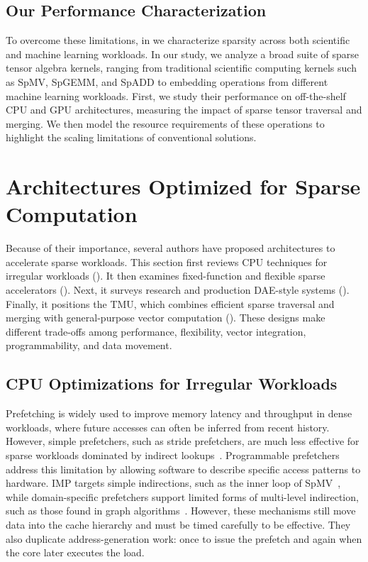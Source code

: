 \subsection{Our Performance Characterization} \label{sec:related-work-our-performance-characterization}
To overcome these limitations, in  we characterize sparsity across both scientific and machine learning workloads. In our study, we analyze a broad suite of sparse tensor algebra kernels, ranging from traditional scientific computing kernels such as SpMV, SpGEMM, and SpADD to embedding operations from different machine learning workloads. First, we study their performance on off-the-shelf CPU and GPU architectures, measuring the impact of sparse tensor traversal and merging. We then model the resource requirements of these operations to highlight the scaling limitations of conventional solutions.

\section{Architectures Optimized for Sparse Computation} \label{sec:related-work-sparse-architectures}

Because of their importance, several authors have proposed architectures to accelerate sparse workloads. This section first reviews CPU techniques for irregular workloads (). It then examines fixed-function and flexible sparse accelerators (). Next, it surveys research and production DAE-style systems (). Finally, it positions the TMU, which combines efficient sparse traversal and merging with general-purpose vector computation (). These designs make different trade-offs among performance, flexibility, vector integration, programmability, and data movement.

\subsection{CPU Optimizations for Irregular Workloads} \label{sec:related-work-cpu-irregular-optimizations}
Prefetching is widely used to improve memory latency and throughput in dense workloads, where future accesses can often be inferred from recent history. However, simple prefetchers, such as stride prefetchers, are much less effective for sparse workloads dominated by indirect lookups~\cite{yu2015micro,jones2016sc,talati2021hpca}. Programmable prefetchers address this limitation by allowing software to describe specific access patterns to hardware. IMP targets simple indirections, such as the inner loop of SpMV~\cite{yu2015micro}, while domain-specific prefetchers support limited forms of multi-level indirection, such as those found in graph algorithms~\cite{jones2016sc,talati2021hpca}. However, these mechanisms still move data into the cache hierarchy and must be timed carefully to be effective. They also duplicate address-generation work: once to issue the prefetch and again when the core later executes the load.

